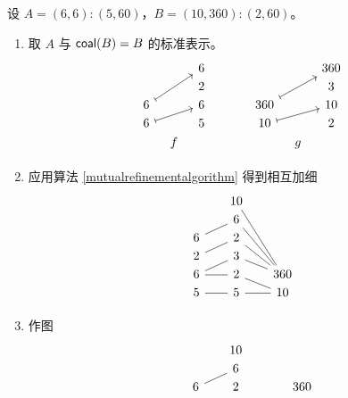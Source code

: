 \begin{example}
    设 $A = (6,6):(5,60)$，$B = (10,360):(2,60)$。
    \begin{enumerate}
        \item 取 $A$ 与 $\mathsf{coal}(B) = B$ 的标准表示。
        \[ \begin{tikzcd}[row sep = 1, column sep = 8]
        & & 6 & & & & & & 360\\
 & & 2 & & & & & & 3\\
6 \ar[uurr,mapsto] & & 6 & & & & 360 \ar[uurr,mapsto] & & 10\\
6 \ar[urr,mapsto] & & 5 & & & & 10 \ar[urr,mapsto] & & 2\\
 & f & & & & & & g & \\
        \end{tikzcd}\]
        \item 应用算法 \ref{mutualrefinementalgorithm} 得到相互加细
                        \[ \begin{tikzcd}[row sep = 1, column sep = 8]
   & & 10 & & \\
   & & 6 & & \\
 6 \ar[urr,-] & & 2 & & \\
 2 \ar[urr,-] & & 3& & \\
 6 \ar[rr,-] \ar[urr,-] & & 2 & & \ar[ull,-] \ar[uull,-] \ar[uuull,-] \ar[uuuull,-] 360 \\
 5 \ar[rr,-]& & 5 & & \ar[ull,-] \ar[ll,-] 10 \\
& & & & \\
        \end{tikzcd}\]
        \item 作图
                \[ \begin{tikzcd}[row sep = 1, column sep = 8]
& &   & & 10 & & & & \\
& &   & & 6 & & & & \\
& & 6 \ar[urr,-] & & 2 & & & & 360\\

\end{tikzcd}\]
\end{enumerate}
\end{example}
